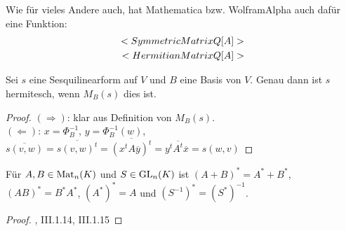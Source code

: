 \begin{mathematica}
	Wie für vieles Andere auch, hat Mathematica bzw. WolframAlpha auch dafür eine Funktion:
	\begin{align}
		\texttt{SymmetricMatrixQ[A]}\notag \\
		\texttt{HermitianMatrixQ[A]}\notag
	\end{align}
\end{mathematica}

\begin{proposition}
	Sei $s$ eine Sesquilinearform auf $V$ und $B$ eine Basis von $V$. Genau dann ist $s$ hermitesch, wenn $M_B(s)$ dies ist.
\end{proposition}
\begin{proof}
	$(\Rightarrow)$: klar aus Definition von $M_B(s)$. \\
	$(\Leftarrow)$: $x=\Phi_B^{-1}$, $y=\Phi_B^{-1}(w)$, $\overline{s(v,w)}=\overline{s(v,w)^t}=\overline{(x^tA\overline{y})^t}=y^t\overline{A^t}\overline{x}=s(w,v)$
\end{proof}

\begin{proposition}
	Für $A,B\in\Mat_n(K)$ und $S\in\GL_n(K)$ ist $(A+B)^*=A^*+B^*$, $(AB)^*=B^*A^*$, $(A^*)^*=A$ und $(S^{-1})^*=(S^*)^{-1}$.
\end{proposition}
\begin{proof}
	, III.1.14, III.1.15 %
\end{proof}